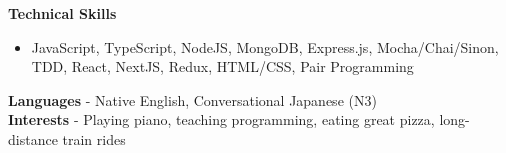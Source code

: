 
\begin{cvparagraph}

  \textbf{Technical Skills}
  \begin{itemize}[noitemsep, topsep=-0.6em, leftmargin=1.5em]
    \item {JavaScript, TypeScript, NodeJS, MongoDB, Express.js, Mocha/Chai/Sinon, TDD, React, NextJS, Redux, HTML/CSS, Pair Programming}
  \end{itemize}

  \textbf{Languages} - Native English, Conversational Japanese (N3)\\
  \textbf{Interests} - Playing piano, teaching programming, eating great pizza, long-distance train rides

\end{cvparagraph}
